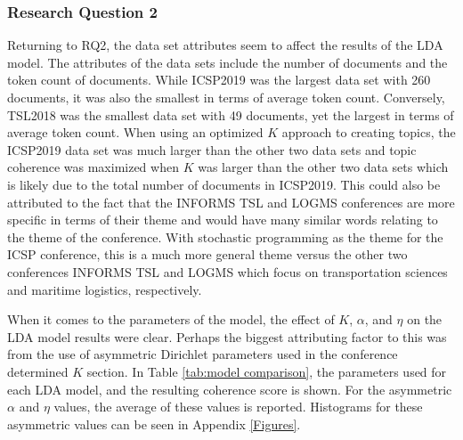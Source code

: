 \documentclass[a4paper, 12pt, twoside]{article}
\numberwithin{equation}{section} %
\begin{document}
\subsubsection{Research Question 2}

Returning to RQ2, the data set attributes seem to affect the results of the LDA model. The attributes of the data sets include the number of documents and the token count of documents. While ICSP2019 was the largest data set with 260 documents, it was also the smallest in terms of average token count. Conversely, TSL2018 was the smallest data set with 49 documents, yet the largest in terms of average token count. When using an optimized $K$ approach to creating topics, the ICSP2019 data set was much larger than the other two data sets and topic coherence was maximized when $K$ was larger than the other two data sets which is likely due to the total number of documents in ICSP2019. This could also be attributed to the fact that the INFORMS TSL and LOGMS conferences are more specific in terms of their theme and would have many similar words relating to the theme of the conference. With stochastic programming as the theme for the ICSP conference, this is a much more general theme versus the other two conferences INFORMS TSL and LOGMS which focus on transportation sciences and maritime logistics, respectively.

When it comes to the parameters of the model, the effect of $K$, $\alpha$, and $\eta$ on the LDA model results were clear. Perhaps the biggest attributing factor to this was from the use of asymmetric Dirichlet parameters used in the conference determined $K$ section. In Table \ref{tab:model comparison}, the parameters used for each LDA model, and the resulting coherence score is shown. For the asymmetric $\alpha$ and $\eta$ values, the average of these values is reported. Histograms for these asymmetric values can be seen in Appendix \ref{Figures}. 
\end{document}
